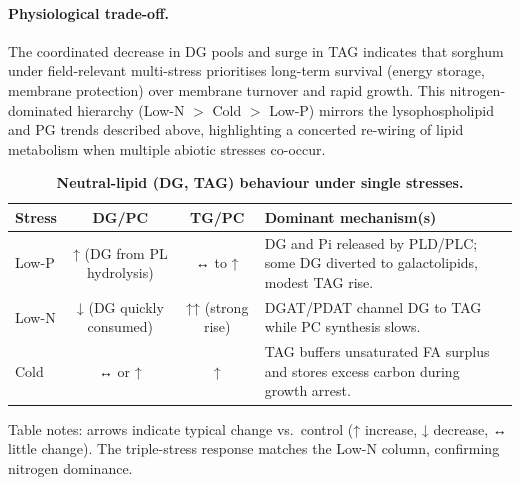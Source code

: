 \documentclass[10pt,letterpaper]{article}
\begin{document}
\paragraph{Physiological trade-off.}
The coordinated decrease in DG pools and surge in TAG indicates that
sorghum under field-relevant multi-stress prioritises long-term survival
(energy storage, membrane protection) over membrane turnover and rapid
growth.
This nitrogen-dominated hierarchy (Low-N \(\!>\) Cold \(\!>\) Low-P) mirrors
the lysophospholipid and PG trends described above, highlighting a
concerted re-wiring of lipid metabolism when multiple abiotic stresses
co-occur.

\begin{table}[!ht]
  \begin{adjustwidth}{-2.25in}{0in} %
    \centering
    \caption{{\bf Neutral-lipid (DG, TAG) behaviour under single stresses.}}
    \begin{tabular}{|l|c|c|p{4in}|}
      \hline
      \textbf{Stress} & \textbf{DG/PC} & \textbf{TG/PC} &
      \textbf{Dominant mechanism(s)} \\ \hline
      Low-P  & ↑ (DG from PL hydrolysis) & ↔ to ↑ &
      DG and Pi released by PLD/PLC; some DG diverted to galactolipids,
      modest TAG rise. \\ \hline
      Low-N  & ↓ (DG quickly consumed) & ↑↑ (strong rise) &
      DGAT/PDAT channel DG to TAG while PC synthesis slows. \\ \hline
      Cold   & ↔ or ↑ & ↑ &
      TAG buffers unsaturated FA surplus and stores excess carbon
      during growth arrest. \\ \hline
    \end{tabular}
    \begin{flushleft}
      Table notes: arrows indicate typical change vs.\ control
      (↑ increase, ↓ decrease, ↔ little change).  The triple-stress
      response matches the Low-N column, confirming nitrogen dominance.
    \end{flushleft}
    \label{table:neutral_stress_single}
  \end{adjustwidth}
\end{table}
\end{document}
